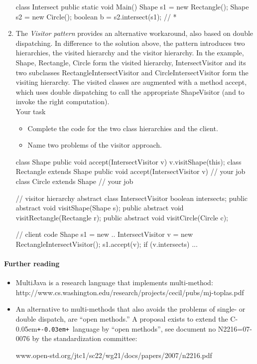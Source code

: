 \documentclass{article}
\newcommand{\Cpp}{C\kern-0.05em\texttt{+\kern-0.03em+}}
\begin{document}
\begin{enumerate}
\begin{java}
class Intersect {
   public static void Main() {
      Shape s1 = new Rectangle(); 
      Shape s2 = new Circle();
      boolean b = s2.intersect(s1);        // *
   }
}
\end{java}
\item The \textit{Visitor pattern} provides an alternative workaround,
also based on double dispatching. In difference
to the solution above, the pattern 
introduces two hierarchies, the visited
hierarchy and the visitor hierarchy. In the example,
 \textsf{Shape, Rectangle, Circle}
form the visited hierarchy, \textsf{IntersectVisitor} and its two
subclasses \textsf{RectangleIntersectVisitor} and \textsf{CircleIntersectVisitor}
form the visiting hierarchy. The visited classes are
augmented with a method \textsf{accept}, which uses double dispatching
to call the appropriate ShapeVisitor (and to invoke the
right computation). 
\\
Your task
\begin{itemize}
\item Complete the code for the two class hierarchies and the client.
\item Name two problems of the visitor approach.
\end{itemize}

\begin{java2}
class Shape {
    public void accept(IntersectVisitor v) {
	v.visitShape(this);
    }
}
class Rectangle extends Shape {
public  void accept(IntersectVisitor v) { 
        // your job
    }
}
class Circle extends Shape {
   // your job
}
 
// visitor hierarchy
abstract class IntersectVisitor { 
    boolean intersects; 
    public abstract void visitShape(Shape s);
    public abstract void visitRectangle(Rectangle r); 
    public abstract void visitCircle(Circle c); 
} 

// client code
  Shape s1 = new ..
  IntersectVisitor v = new RectangleIntersectVisitor();
  s1.accept(v);
  if (v.intersects) ...
\end{java2}
\end{enumerate}

\paragraph{Further reading}
\begin{itemize}
\item MultiJava is a research language that implements multi-method:\\
\textsf{http://www.cs.washington.edu/research/projects/cecil/pubs/mj-toplas.pdf}
\item An alternative to multi-methods that also avoids the problems of
single- or double dispatch, are ``open methods.'' A
 proposal exists to extend the \Cpp\ language by ``open methods'', see
document no N2216=07-0076 by the standardization committee:

\textsf{www.open-std.org/jtc1/sc22/wg21/docs/papers/2007/n2216.pdf}
\end{itemize}
\newpage
\end{document}
